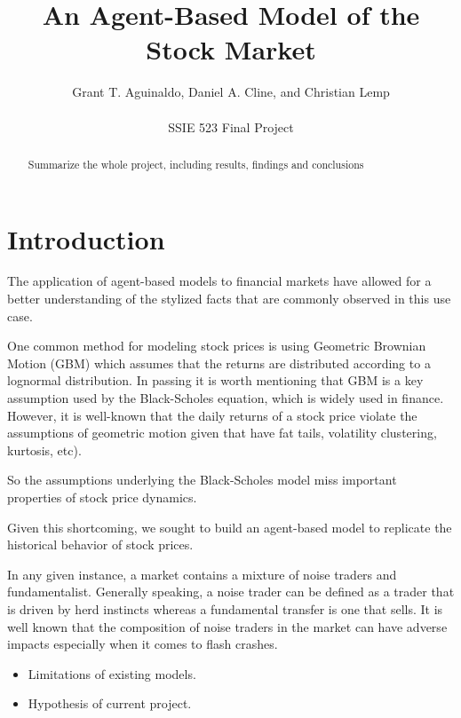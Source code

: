 \documentclass[11pt]{article}
\begin{document}
\title{An Agent-Based Model of the Stock Market}

\author{Grant T. Aguinaldo, Daniel A. Cline, and Christian Lemp \\ \\ SSIE 523 Final Project}

\maketitle

\begin{abstract}
Summarize the whole project, including results, findings and conclusions
\end{abstract}


\pagebreak





\section{Introduction}

The application of agent-based models to financial markets have allowed for a better understanding of the stylized facts that are commonly observed in this use case.

One common method for modeling stock prices is using Geometric Brownian Motion (GBM) which assumes that the returns are distributed according to a lognormal distribution. In passing it is worth mentioning that GBM is a key assumption used by the Black-Scholes equation, which is widely used in finance. However, it is well-known that the daily returns of a stock price violate the assumptions of geometric motion given that have fat tails, volatility clustering, kurtosis, etc). 

So the assumptions underlying the Black-Scholes model miss important properties of stock price dynamics.

Given this shortcoming, we sought to build an agent-based model to replicate the historical behavior of stock prices. 

In any given instance, a market contains a mixture of noise traders and fundamentalist. Generally speaking, a noise trader can be defined as a trader that is driven by herd instincts whereas a fundamental transfer is one that sells. It is well known that the composition of noise traders in the market can have adverse impacts especially when it comes to flash crashes. 


\begin{itemize}
\item Limitations of existing models.
\item Hypothesis of current project. 
\end{itemize}
\end{document}
